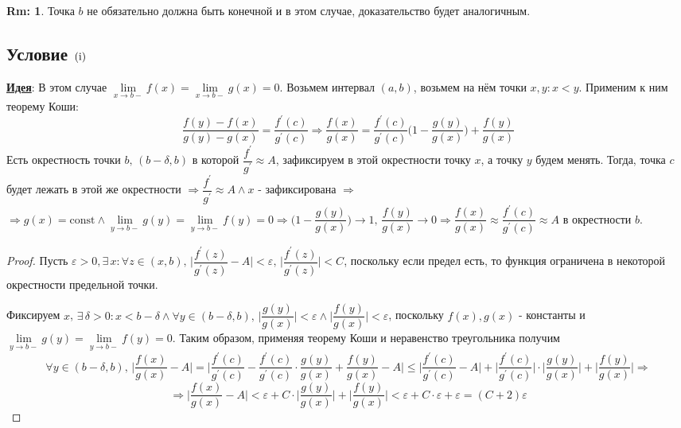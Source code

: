 \documentclass[12pt]{article}
\newcommand{\RN}[1]{%
	\textup{\uppercase\expandafter{\romannumeral#1}}%
}
\newcommand{\VE}{\varepsilon}
\theoremstyle{definition}
\newtheorem{rem}{Rm:}
\begin{document}
\begin{rem}
	Точка $b$ не обязательно должна быть конечной и в этом случае, доказательство будет аналогичным.
\end{rem}

\subsection*{Условие $(\RN{1})$}
\uline{\textbf{Идея}}: В этом случае $\!\lim\limits_{x \to b-}f(x) = \! \lim\limits_{x \to b-}g(x) = 0$. Возьмем интервал $(a,b)$, возьмем на нём точки $x, y \colon x < y$. 
Применим к ним теорему Коши: 
$$\dfrac{f(y) - f(x)}{g(y) - g(x)} = \dfrac{f^\prime(c)}{g^\prime(c)} \Rightarrow \dfrac{f(x)}{g(x)} = \dfrac{f^\prime(c)}{g^\prime(c)} \bigg(1 - \dfrac{g(y)}{g(x)} \bigg) + \dfrac{f(y)}{g(x)}$$
Есть окрестность точки $b, \, (b-\delta,b)$ в которой $\dfrac{f^\prime}{g^\prime} \approx A$, зафиксируем в этой окрестности точку $x$, а точку $y$ будем менять. Тогда, точка $c$ будет лежать в этой же окрестности $\Rightarrow \dfrac{f^\prime}{g^\prime} \approx A \wedge x$ - зафиксирована $\Rightarrow$\\ 
$\Rightarrow g(x) = \text{const} \wedge  \!\lim\limits_{y \to b-}g(y) = \!\lim\limits_{y \to b-}f(y) = 0 \Rightarrow \bigg(1 - \dfrac{g(y)}{g(x)} \bigg) \to 1, \, \dfrac{f(y)}{g(x)} \to 0 \Rightarrow \dfrac{f(x)}{g(x)} \approx  \dfrac{f^\prime(c)}{g^\prime(c)} \approx A$ в окрестности $b$.
\begin{proof}
	Пусть $\VE > 0, \exists \, x \colon  \forall z \in (x,b), \, \bigg|\dfrac{f^\prime(z)}{g^\prime(z)} - A\bigg| < \VE, \, \bigg|\dfrac{f^\prime(z)}{g^\prime(z)}\bigg| < C$, поскольку если предел есть, то функция ограничена в некоторой окрестности предельной точки. 
	
	Фиксируем $x$, $\exists \, \delta >0 \colon x < b -\delta \wedge \forall y \in (b -\delta,b), \, \bigg| \dfrac{g(y)}{g(x)} \bigg|< \VE \wedge \bigg|\dfrac{f(y)}{g(x)}\bigg| < \VE$, поскольку $f(x),g(x)$ - константы и $\!\lim\limits_{y \to b-}g(y) = \!\lim\limits_{y \to b-}f(y) = 0$. Таким образом, применяя теорему Коши и неравенство треугольника получим
	$$\forall y \in (b-\delta, b), \, \bigg|\dfrac{f(x)}{g(x)} - A \bigg| = \bigg|\dfrac{f^\prime(c)}{g^\prime(c)}  - \dfrac{f^\prime(c)}{g^\prime(c)}{\cdot}\dfrac{g(y)}{g(x)} + \dfrac{f(y)}{g(x)} - A \bigg| \leq \bigg|\dfrac{f^\prime(c)}{g^\prime(c)} - A \bigg| + \bigg|\dfrac{f^\prime(c)}{g^\prime(c)} \bigg|{\cdot}\bigg|\dfrac{g(y)}{g(x)}\bigg| + \bigg|\dfrac{f(y)}{g(x)}\bigg| \Rightarrow $$
	$$\Rightarrow \bigg|\dfrac{f(x)}{g(x)} - A \bigg| < \VE + C{\cdot}\bigg|\dfrac{g(y)}{g(x)}\bigg| + \bigg|\dfrac{f(y)}{g(x)}\bigg| < \VE + C{\cdot}\VE + \VE = (C+ 2)\VE$$
\end{proof}
\end{document}
